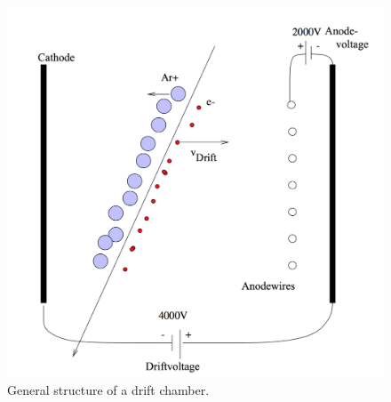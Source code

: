 \documentclass[12pt]{article}
\begin{document}
\begin{figure}[h]
\includegraphics[width=13cm]{pics/PRINZIP}
\centering
\caption{General structure of a drift chamber.}
\label{fig:structure}
\end{figure}

\newpage
\end{document}
